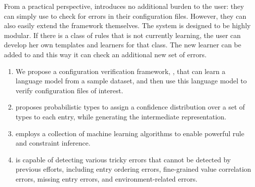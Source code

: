 {From a practical perspective, 
\app introduces no additional burden 
to the user: they can simply use \app to check for errors in their
configuration files. However, they can also easily extend the framework
themselves. The system is designed to be highly modular. If there is a
class of rules that \app is not currently learning, the user can develop
her own templates and learners for that class. The new learner can be
added to \app and this way it can check an additional new set of
errors.

\begin{enumerate}

\item We propose a configuration verification
framework, \app, that can learn a language model from a sample
dataset, and then use this language model to verify 
configuration files of interest.
 
\item \app proposes probabilistic types to assign a confidence 
distribution over a set of types to each entry, 
while generating the intermediate representation. 

\item \app employs a collection of machine learning algorithms to 
enable powerful rule and constraint inference.

\item \app is capable of detecting various tricky errors that cannot
be detected by previous efforts,
including entry ordering errors, fine-grained value correlation errors, 
missing entry errors, and environment-related errors. 

\end{enumerate}

}
